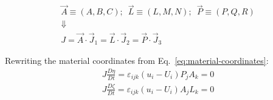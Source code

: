 \[\begin{array}{c}
\vec A \equiv \left( {A,B,C} \right);\,\,\,\vec L \equiv \left( {L,M,N} \right);\,\,\,\vec P \equiv \left( {P,Q,R} \right)\\
 \Downarrow \\
J = \vec A \cdot {{\vec J}_1} = \vec L \cdot {{\vec J}_2} = \vec P \cdot {{\vec J}_3}
\end{array}\]

Rewriting the material coordinates from Eq.~\ref{eq:material-coordinates}:
\begin{equation}
\label{eq:compatibility-conditions-index}
\begin{array}{l}
J\frac{{D\eta }}{{Dt}} = {\varepsilon _{ijk}}\left( {{u_i} - {U_i}} \right){P_j}{A_k} = 0\\
J\frac{{D\zeta }}{{Dt}} = {\varepsilon _{ijk}}\left( {{u_i} - {U_i}} \right){A_j}{L_k} = 0
\end{array}
\end{equation}

